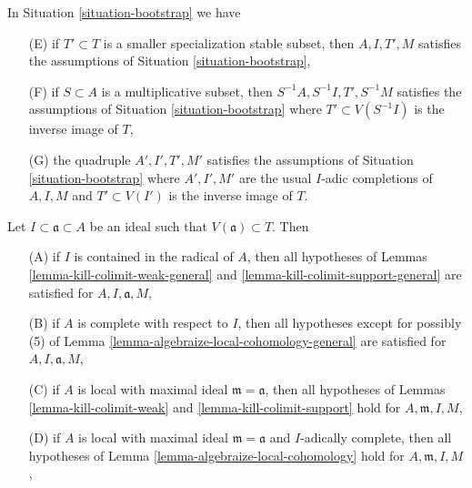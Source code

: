 \begin{lemma}
\label{lemma-bootstrap-inherited}
In Situation \ref{situation-bootstrap} we have
\begin{enumerate}
\item[(E)] if $T' \subset T$ is a smaller specialization stable subset, then
$A, I, T', M$ satisfies the assumptions of Situation \ref{situation-bootstrap},
\item[(F)] if $S \subset A$ is a multiplicative subset, then
$S^{-1}A, S^{-1}I, T', S^{-1}M$
satisfies the assumptions of Situation \ref{situation-bootstrap}
where $T' \subset V(S^{-1}I)$ is the inverse image of $T$,
\item[(G)] the quadruple $A', I', T', M'$
satisfies the assumptions of Situation \ref{situation-bootstrap}
where $A', I', M'$ are the usual $I$-adic completions of $A, I, M$
and $T' \subset V(I')$ is the inverse image of $T$.
\end{enumerate}
Let $I \subset \mathfrak a \subset A$ be an ideal such that
$V(\mathfrak a) \subset T$. Then
\begin{enumerate}
\item[(A)] if $I$ is contained in the radical of $A$, then all hypotheses of
Lemmas \ref{lemma-kill-colimit-weak-general} and
\ref{lemma-kill-colimit-support-general} are satisfied
for $A, I, \mathfrak a, M$,
\item[(B)] if $A$ is complete with respect to $I$, then
all hypotheses except for possibly (5) of
Lemma \ref{lemma-algebraize-local-cohomology-general}
are satisfied for $A, I, \mathfrak a, M$,
\item[(C)] if $A$ is local with maximal ideal $\mathfrak m = \mathfrak a$,
then all hypotheses of
Lemmas \ref{lemma-kill-colimit-weak} and \ref{lemma-kill-colimit-support}
hold for $A, \mathfrak m, I, M$,
\item[(D)] if $A$ is local with maximal ideal $\mathfrak m = \mathfrak a$
and $I$-adically complete, then all hypotheses of
Lemma \ref{lemma-algebraize-local-cohomology}
hold for $A, \mathfrak m, I, M$,
\end{enumerate}
\end{lemma}

